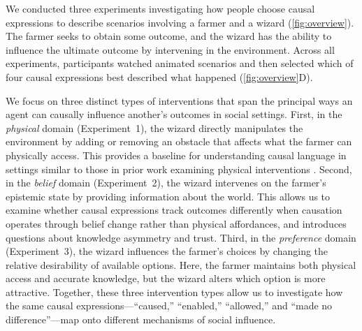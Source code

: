 \documentclass[10pt,letterpaper]{article}
\begin{document}
We conducted three experiments investigating how people choose causal expressions to describe scenarios involving a farmer and a wizard (\autoref{fig:overview}). 
The farmer seeks to obtain some outcome, and the wizard has the ability to influence the ultimate outcome by intervening in the environment.
Across all experiments, participants watched animated scenarios and then selected which of four causal expressions best described what happened (\autoref{fig:overview}D). 


We focus on three distinct types of interventions that span the principal ways an agent can causally influence another's outcomes in social settings. 
First, in the \textit{physical} domain (Experiment~1), the wizard directly manipulates the environment by adding or removing an obstacle that affects what the farmer can physically access. 
This provides a baseline for understanding causal language in settings similar to those in prior work examining physical interventions \citep{cao_semantics_2023}. 
Second, in the \textit{belief} domain (Experiment~2), the wizard intervenes on the farmer's epistemic state by providing information about the world. 
This allows us to examine whether causal expressions track outcomes differently when causation operates through belief change rather than physical affordances, and introduces questions about knowledge asymmetry and trust. 
Third, in the \textit{preference} domain (Experiment~3), the wizard influences the farmer's choices by changing the relative desirability of available options. 
Here, the farmer maintains both physical access and accurate knowledge, but the wizard alters which option is more attractive. 
Together, these three intervention types allow us to investigate how the same causal expressions—``caused,'' ``enabled,'' ``allowed,'' and ``made no difference''—map onto different mechanisms of social influence.
\end{document}
